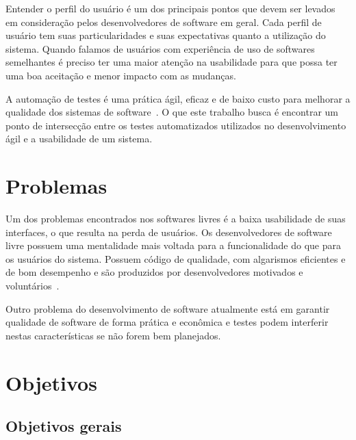 Entender o perfil do usuário é um dos principais pontos que devem ser levados em consideração pelos desenvolvedores de software em geral. Cada perfil de usuário tem suas particularidades e suas expectativas quanto a utilização do sistema. Quando falamos de usuários com experiência de uso de softwares semelhantes é preciso ter uma maior atenção na usabilidade para que possa ter uma boa aceitação e menor impacto com as mudanças.

A automação de testes é uma prática ágil, eficaz e de baixo custo para melhorar
a qualidade dos sistemas de software~\cite{cotter1995}. O que este trabalho busca é encontrar um ponto de intersecção entre os testes automatizados utilizados no desenvolvimento ágil e a usabilidade de um sistema. 
\section{Problemas}

Um dos problemas encontrados nos softwares livres é a baixa usabilidade de suas interfaces, o que resulta na perda de usuários. 
%
Os desenvolvedores de software livre possuem uma mentalidade mais voltada para a funcionalidade do que para os usuários do sistema. Possuem código de qualidade, com algarismos eficientes e de bom desempenho e são produzidos por desenvolvedores motivados e voluntários~\cite{santos2012}. 

Outro problema do desenvolvimento de software atualmente está em garantir qualidade de software de forma prática e econômica e testes podem interferir nestas características se não forem bem planejados.


\section{Objetivos}

\subsection{Objetivos gerais}
	 
